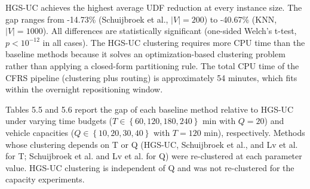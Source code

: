 \documentclass[11pt]{article}
\numberwithin{table}{section}
\numberwithin{figure}{section}
\begin{document}
HGS-UC achieves the highest average UDF reduction at every instance size. The gap ranges from -14.73\% (Schuijbroek et al., $\mid V\mid =200$) to -40.67\% (KNN, $\mid V\mid =1000$). All differences are statistically significant (one-sided Welch’s t-test, $p<{{10}^{-12}}$ in all cases). The HGS-UC clustering requires more CPU time than the baseline methods because it solves an optimization-based clustering problem rather than applying a closed-form partitioning rule. The total CPU time of the CFRS pipeline (clustering plus routing) is approximately 54 minutes, which fits within the overnight repositioning window.

Tables 5.5 and 5.6 report the gap of each baseline method relative to HGS-UC under varying time budgets ($T\in \left\{ 60,120,180,240 \right\}$ min with $Q=20$) and vehicle capacities ($Q\in \left\{ 10,20,30,40 \right\}$ with $T=120$ min), respectively. Methods whose clustering depends on T or Q (HGS-UC, Schuijbroek et al., and Lv et al. for T; Schuijbroek et al. and Lv et al. for Q) were re-clustered at each parameter value. HGS-UC clustering is independent of Q and was not re-clustered for the capacity experiments.
\end{document}
